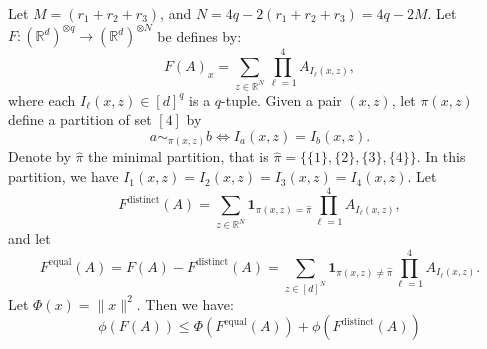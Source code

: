 \documentclass[]{article}
\makeatletter
\numberwithin{equation}{section}
\theoremstyle{definition}
\renewenvironment{proof}[1][\proofname]{\par
  \pushQED{\qed}%
  \normalfont \topsep6\p@\@plus6\p@\relax
  \trivlist
  \item[\hskip\labelsep\textbf{#1.}]\ignorespaces
}{%
  \popQED\endtrivlist\@endpefalse
}
\newcommand{\RR}{\mathbb{R}}
\makeatother
\begin{document}
\begin{proof}
Let $M = (r_1 + r_2 + r_3)$, and $N = 4q - 2(r_1 + r_2 + r_3 ) = 4q-2M$. Let $F : (\RR^{d})^{\otimes q} \to (\RR^{d})^{ \otimes N}$ be defines by: 
\begin{equation}
    F(A)_{x} = \sum_{z \in \RR^{N}}  \prod_{\ell = 1}^{4} A_{I_{\ell}(x,z)},
\end{equation}
where each $I_{\ell}(x,z) \in [d]^{q}$ is a $q$-tuple. Given a pair $(x,z)$, let $\pi(x,z)$ define a partition of set $[4]$ by
\begin{equation}
    a \sim_{\pi(x,z)} b \iff I_{a}(x,z) =I_{b}(x,z). 
\end{equation}
Denote by $\hat{\pi}$ the minimal partition, that is $\hat{\pi} = \{ \{1 \}, \{ 2\}, \{ 3\},\{ 4\}\}$. In this partition, we have $I_{1}(x,z) = I_{2}(x,z) = I_{3}(x,z)=I_{4}(x,z)$. Let 
\begin{equation}
    F^{\mathrm{distinct}}(A) = \sum_{z \in \RR^{N}} \mathbf{1}_{\pi(x,z) = \hat{\pi}} \prod_{\ell = 1}^{4} A_{I_{\ell}(x,z)},
\end{equation}
and let 
\begin{equation}
    F^{\mathrm{equal}}(A) = F(A)  - F^{\mathrm{distinct}}(A) = \sum_{z \in [d]^{N}} \mathbf{1}_{\pi(x,z) \not = \hat{\pi}} \prod_{\ell = 1}^{4} A_{I_{\ell}(x,z)}.
\end{equation}
Let $\Phi (x) = \| x\|^{2}$. Then we have: 
\begin{equation}
    \phi(F(A)) \leq \Phi(F^{\mathrm{equal}}(A)) + \phi(F^{\mathrm{distinct}}(A))
\end{equation}


\end{proof}
\end{document}
